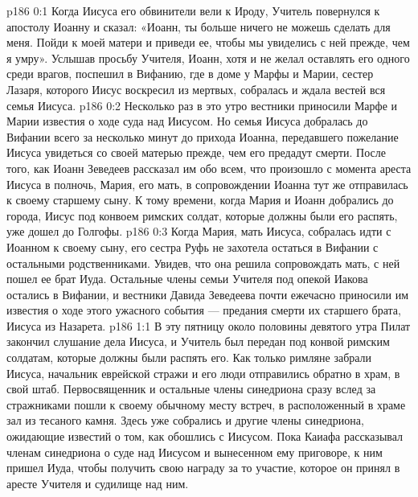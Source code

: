 \author{Комиссия срединников}
\vs p186 0:1 Когда Иисуса его обвинители вели к Ироду, Учитель повернулся к апостолу Иоанну и сказал: «Иоанн, ты больше ничего не можешь сделать для меня. Пойди к моей матери и приведи ее, чтобы мы увиделись с ней прежде, чем я умру». Услышав просьбу Учителя, Иоанн, хотя и не желал оставлять его одного среди врагов, поспешил в Вифанию, где в доме у Марфы и Марии, сестер Лазаря, которого Иисус воскресил из мертвых, собралась и ждала вестей вся семья Иисуса.
\vs p186 0:2 Несколько раз в это утро вестники приносили Марфе и Марии известия о ходе суда над Иисусом. Но семья Иисуса добралась до Вифании всего за несколько минут до прихода Иоанна, передавшего пожелание Иисуса увидеться со своей матерью прежде, чем его предадут смерти. После того, как Иоанн Зеведеев рассказал им обо всем, что произошло с момента ареста Иисуса в полночь, Мария, его мать, в сопровождении Иоанна тут же отправилась к своему старшему сыну. К тому времени, когда Мария и Иоанн добрались до города, Иисус под конвоем римских солдат, которые должны были его распять, уже дошел до Голгофы.
\vs p186 0:3 Когда Мария, мать Иисуса, собралась идти с Иоанном к своему сыну, его сестра Руфь не захотела остаться в Вифании с остальными родственниками. Увидев, что она решила сопровождать мать, с ней пошел ее брат Иуда. Остальные члены семьи Учителя под опекой Иакова остались в Вифании, и вестники Давида Зеведеева почти ежечасно приносили им известия о ходе этого ужасного события --- предания смерти их старшего брата, Иисуса из Назарета.
\vs p186 1:1 В эту пятницу около половины девятого утра Пилат закончил слушание дела Иисуса, и Учитель был передан под конвой римским солдатам, которые должны были распять его. Как только римляне забрали Иисуса, начальник еврейской стражи и его люди отправились обратно в храм, в свой штаб. Первосвященник и остальные члены синедриона сразу вслед за стражниками пошли к своему обычному месту встреч, в расположенный в храме зал из тесаного камня. Здесь уже собрались и другие члены синедриона, ожидающие известий о том, как обошлись с Иисусом. Пока Каиафа рассказывал членам синедриона о суде над Иисусом и вынесенном ему приговоре, к ним пришел Иуда, чтобы получить свою награду за то участие, которое он принял в аресте Учителя и судилище над ним.

